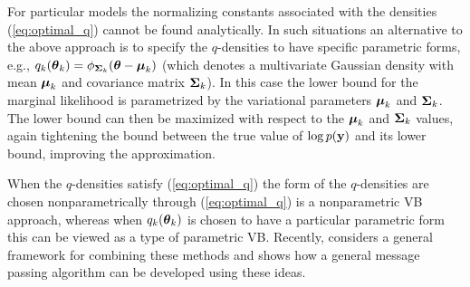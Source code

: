 For particular models the normalizing constants associated with the densities
(\ref{eq:optimal_q}) cannot be found analytically. In such situations
an alternative to the above approach is to specify the $q$-densities  to have specific
parametric forms, e.g., $q_k({\boldsymbol \theta}_k) = \phi_{{\boldsymbol \Sigma}_k}({\boldsymbol \theta} - {\boldsymbol \mu}_k)$
(which denotes a multivariate Gaussian density with
mean ${\boldsymbol \mu}_k$ and covariance matrix ${\boldsymbol \Sigma}_k$). In this case the  
lower bound for the marginal likelihood is parametrized by the variational
parameters ${\boldsymbol \mu}_k$ and ${\boldsymbol \Sigma}_k$. The lower bound can then be maximized
with respect to the ${\boldsymbol \mu}_k$ and ${\boldsymbol \Sigma}_k$ values, again tightening the bound
between the true value of $\log p({\bf y})$ and its lower bound, improving the
approximation. 

When the $q$-densities satisfy (\ref{eq:optimal_q}) the form of the $q$-densities
are chosen nonparametrically through  (\ref{eq:optimal_q}) is a nonparametric VB
approach,
whereas when $q_k({\boldsymbol \theta}_k)$ is chosen to have a particular parametric form
this can be viewed as a type of parametric VB. Recently, \cite{Wand2017} considers
a general framework for combining these methods and shows how a general message passing algorithm can be developed using these ideas.




